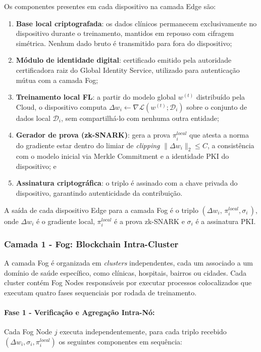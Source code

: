 \documentclass[12pt]{article}
\begin{document}
Os componentes presentes em cada dispositivo na camada Edge são:
\begin{enumerate}
    \item \textbf{Base local criptografada}: os dados clínicos permanecem exclusivamente no dispositivo durante o treinamento, mantidos em repouso com cifragem simétrica. Nenhum dado bruto é transmitido para fora do dispositivo;
    \item \textbf{Módulo de identidade digital}: certificado emitido pela autoridade certificadora raiz do Global Identity Service, utilizado para autenticação mútua com a camada Fog;
    \item \textbf{Treinamento local FL}: a partir do modelo global $w^{(t)}$  distribuído pela Cloud, o dispositivo computa $\Delta w_i \leftarrow \nabla\mathcal{L}(w^{(t)}; \mathcal{D}_i)$ sobre o conjunto de dados local $\mathcal{D}_i$, sem compartilhá-lo com nenhuma outra entidade;
    \item \textbf{Gerador de prova (zk-SNARK)}: gera a prova $\pi_i^{{local}}$ que atesta a norma do gradiente estar dentro do limiar de \textit{clipping} $\|\Delta w_i\|_2 \leq C$, a consistência com o modelo inicial via Merkle Commitment e a identidade PKI do dispositivo; e
    \item \textbf{Assinatura criptográfica}: o triplo é assinado com a chave privada do dispositivo, garantindo autenticidade da contribuição.
\end{enumerate}

A saída de cada dispositivo Edge para a camada Fog é o triplo $(\Delta w_i,\, \pi_i^{{local}}, \sigma_i\,)$, onde $\Delta w_i$ é o gradiente local, $\pi_i^{{local}}$ é a prova zk-SNARK e $\sigma_i$ é a assinatura PKI.

\subsubsection{Camada 1 - Fog: Blockchain Intra-Cluster}

A camada Fog é organizada em \textit{clusters} independentes, cada um associado a um domínio de saúde específico, como clínicas, hospitais, bairros ou cidades. Cada cluster contém Fog Nodes responsáveis por executar processos colocalizados que executam quatro fases sequenciais por rodada de treinamento.

\paragraph{Fase 1 - Verificação e Agregação Intra-Nó:} Cada Fog Node $j$ executa independentemente, para cada triplo recebido $(\Delta w_i, \sigma_i, \pi_i^{{local}})$ os seguintes componentes em sequência:
\end{document}
